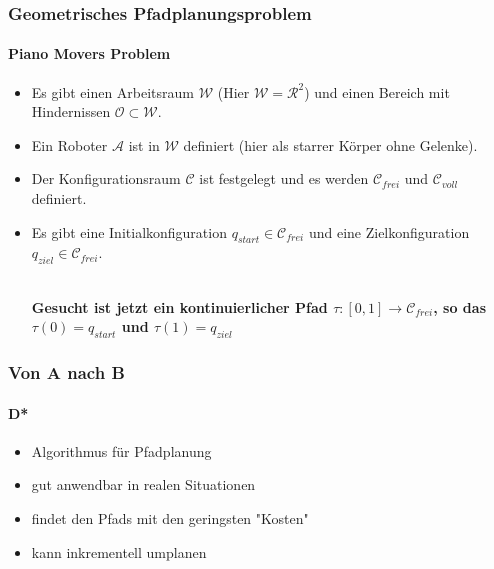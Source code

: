 \documentclass{beamer}
\begin{document}
\begin{frame}
\frametitle{Geometrisches Pfadplanungsproblem}
\framesubtitle{Piano Movers Problem}
\begin{itemize}
\item Es gibt einen Arbeitsraum $\mathcal{W}$ (Hier $\mathcal{W} = \mathcal{R}^2$) und einen Bereich mit Hindernissen $\mathcal{O}\subset \mathcal{W}$.

\item Ein Roboter $\mathcal{A}$ ist in $\mathcal{W}$ definiert (hier als starrer Körper ohne Gelenke).
 \item Der Konfigurationsraum $\mathcal{C}$ ist festgelegt und es werden $\mathcal{C}_{frei}$ und $\mathcal{C}_{voll}$ definiert.
 \item Es gibt eine Initialkonfiguration $q_{start} \in \mathcal{C}_{frei}$ und eine Zielkonfiguration $q_{ziel} \in \mathcal{C}_{frei}$.\\
\quad \\

\begin{block}{}
\begin{center}
\textbf{ Gesucht ist jetzt ein kontinuierlicher Pfad $\tau : [0,1] \rightarrow \mathcal{C}_{frei}$,  so das $\tau(0)=q_{start}$ und $\tau(1) = q_{ziel}$}
\end{center}
\end{block}

\end{itemize}
\end{frame}




\begin{frame}
\frametitle{Von A nach B}
\framesubtitle{D* }

\begin{itemize}
\item Algorithmus für Pfadplanung
\item  gut anwendbar in realen Situationen
\item findet den Pfads mit den geringsten "Kosten"
\item kann inkrementell umplanen
\end{itemize}


\end{frame}
\end{document}
